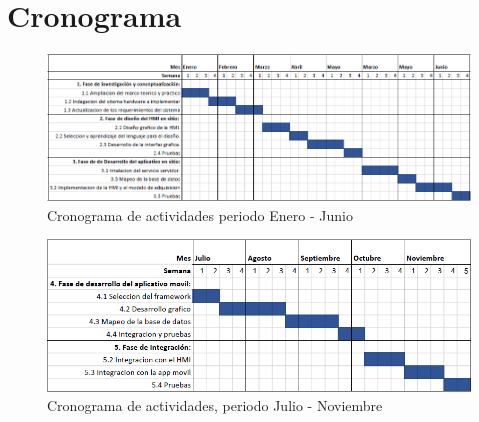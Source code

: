 \section{Cronograma}

\begin{figure}[htbp]
	\centering
		\includegraphics[width=15cm]{figuras/cronograma1.PNG}
	\caption{Cronograma de actividades periodo Enero - Junio}	
	\label{Cronograma periodo Enero - Junio}
\end{figure}

\begin{figure}[htbp]
	\centering
		\includegraphics[width=15cm]{figuras/cronograma2.PNG}
	\caption{Cronograma de actividades, periodo Julio - Noviembre}	
	\label{Cronograma periodo Julio - Noviembre}
\end{figure}